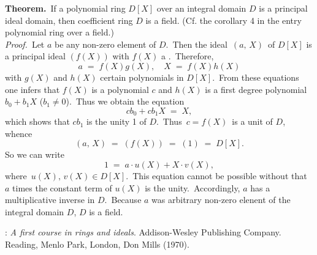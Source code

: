 \documentclass[12pt]{article}
\theoremstyle{definition}
\begin{document}
\textbf{Theorem.}\, If a polynomial ring $D[X]$ over an integral domain $D$ is a principal ideal domain, then coefficient ring $D$ is a field. (Cf. the corollary 4 in the entry polynomial ring over a field.)\\

{\em Proof.}\, Let $a$ be any non-zero element of $D$.\, Then the ideal \,$(a,\,X)$\, of $D[X]$ is a principal ideal $(f(X))$ with $f(X)$ a .\, Therefore, 
$$a \;=\; f(X)g(X), \quad X \;=\; f(X)h(X)$$
with $g(X)$ and $h(X)$ certain polynomials in $D[X]$.\, From these equations one infers that $f(X)$ is a  polynomial $c$ and $h(X)$ is a first degree polynomial $b_0\!+\!b_1X$ ($b_1 \neq 0$).\, Thus we obtain the equation
$$cb_0+cb_1X \;=\; X,$$
which shows that $cb_1$ is the unity 1 of $D$.\, Thus\, $c = f(X)$\, is a unit of $D$, whence
$$(a,\,X) \;=\; (f(X)) \;=\; (1) \;=\; D[X].$$
So we can write 
$$1 \;=\; a\!\cdot\!u(X)+X\!\cdot\!v(X),$$
where\, $u(X),\,v(X) \in D[X]$.\, This equation cannot be possible without that $a$ times the constant term of $u(X)$ is the unity.\, Accordingly, $a$ has a multiplicative inverse in $D$.\, Because $a$ was arbitrary non-zero elenent of the integral domain $D$, $D$ is a field.

\begin{thebibliography}{9}
: {\em A first course in rings and ideals}. Addison-Wesley Publishing Company. Reading, Menlo Park, London, Don Mills (1970).
\end{thebibliography}
\end{document}
